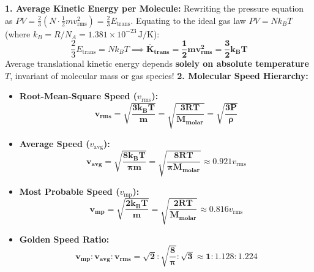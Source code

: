 \documentclass[10pt,a4paper]{article}
\begin{document}
\begin{formulabox}
\textbf{1. Average Kinetic Energy per Molecule:}
Rewriting the pressure equation as $P V = \frac{2}{3} \left(N \cdot \frac{1}{2}m v_{\text{rms}}^2\right) = \frac{2}{3} E_{\text{trans}}$.
Equating to the ideal gas law $P V = N k_B T$ (where $k_B = R/N_A = 1.381 \times 10^{-23}\,\mathrm{J/K}$):
\begin{equation}
  \frac{2}{3} E_{\text{trans}} = N k_B T \implies \mathbf{\overline{K}_{\text{trans}} = \frac{1}{2}m v_{\text{rms}}^2 = \frac{3}{2}k_B T}
\end{equation}
Average translational kinetic energy depends \textbf{solely on absolute temperature $T$}, invariant of molecular mass or gas species!
\textbf{2. Molecular Speed Hierarchy:}
\begin{itemize}
  \item \textbf{Root-Mean-Square Speed ($v_{\text{rms}}$):}
  \begin{equation}
    \mathbf{v_{\text{rms}} = \sqrt{\frac{3 k_B T}{m}} = \sqrt{\frac{3 R T}{M_{\text{molar}}}} = \sqrt{\frac{3 P}{\rho}}}
  \end{equation}
  \item \textbf{Average Speed ($v_{\text{avg}}$):}
  \begin{equation}
    \mathbf{v_{\text{avg}} = \sqrt{\frac{8 k_B T}{\pi m}} = \sqrt{\frac{8 R T}{\pi M_{\text{molar}}}}} \approx 0.921 v_{\text{rms}}
  \end{equation}
  \item \textbf{Most Probable Speed ($v_{\text{mp}}$):}
  \begin{equation}
    \mathbf{v_{\text{mp}} = \sqrt{\frac{2 k_B T}{m}} = \sqrt{\frac{2 R T}{M_{\text{molar}}}}} \approx 0.816 v_{\text{rms}}
  \end{equation}
  \item \textbf{Golden Speed Ratio:}
  \begin{equation}
    \mathbf{v_{\text{mp}} : v_{\text{avg}} : v_{\text{rms}} = \sqrt{2} : \sqrt{\frac{8}{\pi}} : \sqrt{3} \approx 1 : 1.128 : 1.224}
  \end{equation}
\end{itemize}
\end{formulabox}
\end{document}
